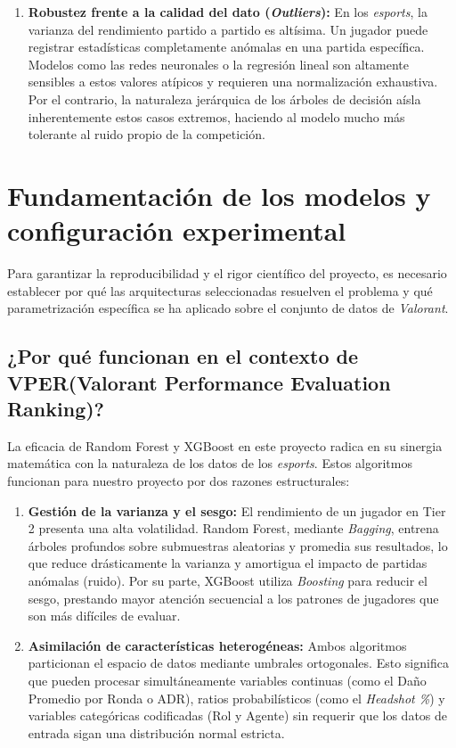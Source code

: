 \documentclass{ULBreport} %
\begin{document}
\begin{enumerate}
    \item \textbf{Robustez frente a la calidad del dato (\textit{Outliers}):}
    En los \textit{esports}, la varianza del rendimiento partido a partido es altísima. Un jugador puede registrar estadísticas completamente anómalas en una partida específica. Modelos como las redes neuronales o la regresión lineal son altamente sensibles a estos valores atípicos y requieren una normalización exhaustiva. Por el contrario, la naturaleza jerárquica de los árboles de decisión aísla inherentemente estos casos extremos, haciendo al modelo mucho más tolerante al ruido propio de la competición.
\end{enumerate}

\section{Fundamentación de los modelos y configuración experimental}

Para garantizar la reproducibilidad y el rigor científico del proyecto, es necesario establecer por qué las arquitecturas seleccionadas resuelven el problema y qué parametrización específica se ha aplicado sobre el conjunto de datos de \textit{Valorant}.

\subsection{¿Por qué funcionan en el contexto de VPER(Valorant Performance Evaluation Ranking)?}

La eficacia de Random Forest y XGBoost en este proyecto radica en su sinergia matemática con la naturaleza de los datos de los \textit{esports}. Estos algoritmos funcionan para nuestro proyecto por dos razones estructurales:

\begin{enumerate}
    \item \textbf{Gestión de la varianza y el sesgo:} El rendimiento de un jugador en Tier 2 presenta una alta volatilidad. Random Forest, mediante \textit{Bagging}, entrena árboles profundos sobre submuestras aleatorias y promedia sus resultados, lo que reduce drásticamente la varianza y amortigua el impacto de partidas anómalas (ruido). Por su parte, XGBoost utiliza \textit{Boosting} para reducir el sesgo, prestando mayor atención secuencial a los patrones de jugadores que son más difíciles de evaluar.
    \item \textbf{Asimilación de características heterogéneas:} Ambos algoritmos particionan el espacio de datos mediante umbrales ortogonales. Esto significa que pueden procesar simultáneamente variables continuas (como el Daño Promedio por Ronda o ADR), ratios probabilísticos (como el \textit{Headshot \%}) y variables categóricas codificadas (Rol y Agente) sin requerir que los datos de entrada sigan una distribución normal estricta.
\end{enumerate}
\end{document}
